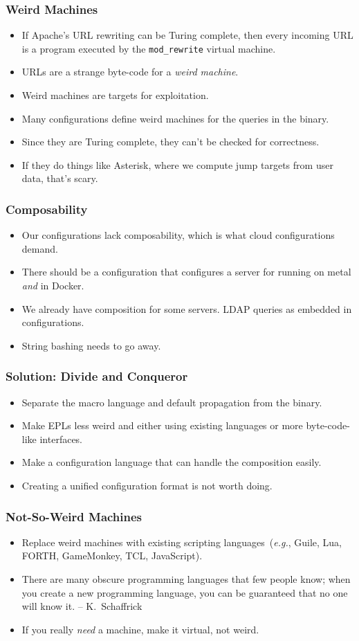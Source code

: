 \documentclass{beamer}
\begin{document}
\begin{frame}\frametitle{Weird Machines}
\begin{itemize}
\item If Apache's URL rewriting can be Turing complete, then every incoming URL is a program executed by the \texttt{mod\_rewrite} virtual machine.
\item URLs are a strange byte-code for a \emph{weird machine}.
\item Weird machines are targets for exploitation.
\item Many configurations define weird machines for the queries in the binary.
\item Since they are Turing complete, they can't be checked for correctness.
\item If they do things like Asterisk, where we compute jump targets from user data, that's scary.
\end{itemize}
\end{frame}

\begin{frame}\frametitle{Composability}
\begin{itemize}
\item Our configurations lack composability, which is what cloud configurations demand.
\item There should be a configuration that configures a server for running on metal \emph{and} in Docker.
\item We already have composition for some servers. LDAP queries as embedded in configurations.
\item String bashing needs to go away.
\end{itemize}
\end{frame}

\begin{frame}\frametitle{Solution: Divide and Conqueror}
\begin{itemize}
\item Separate the macro language and default propagation from the binary.
\item Make EPLs less weird and either using existing languages or more byte-code-like interfaces.
\item Make a configuration language that can handle the composition easily.
\item Creating a unified configuration format is not worth doing.
\end{itemize}
\end{frame}

\begin{frame}\frametitle{Not-So-Weird Machines}
\begin{itemize}
\item Replace weird machines with existing scripting languages~(\emph{e.g.}, Guile, Lua, FORTH, GameMonkey, TCL, JavaScript).
\item There are many obscure programming languages that few people know; when you create a new programming language, you can be guaranteed that no one will know it. -- K.~Schaffrick
\item If you really \emph{need} a machine, make it virtual, not weird.
\end{itemize}
\end{frame}
\end{document}

